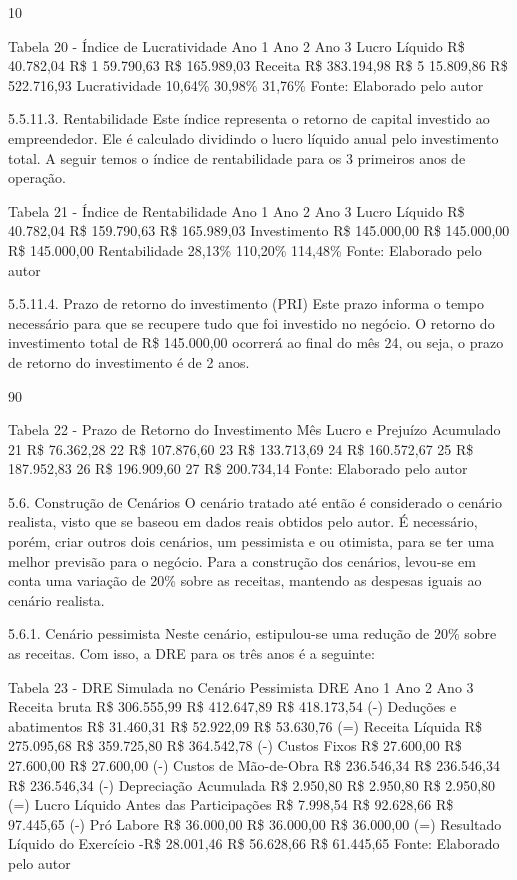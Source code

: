 10%

Tabela 20 - Índice de Lucratividade 
Ano 1	Ano 2	Ano 3
Lucro Líquido	R\$     40.782,04	R\$  1 59.790,63	R\$   165.989,03
Receita	R\$   383.194,98	R\$  5 15.809,86	R\$   522.716,93
Lucratividade	10,64\%	30,98\%	31,76\%
Fonte: Elaborado pelo autor 

5.5.11.3. 	Rentabilidade 
Este índice representa o retorno de capital investido ao empreendedor. Ele é calculado dividindo o lucro líquido anual pelo investimento total. A seguir temos o índice de rentabilidade para os 3 primeiros anos de operação.  

Tabela 21 - Índice de Rentabilidade 
Ano 1	Ano 2	Ano 3
Lucro Líquido	R\$     40.782,04	R\$   159.790,63	R\$   165.989,03
Investimento	R\$   145.000,00	R\$   145.000,00	R\$   145.000,00
Rentabilidade	28,13\%	110,20\%	114,48\%
Fonte: Elaborado pelo autor 

5.5.11.4. 	Prazo de retorno do investimento (PRI) 
Este prazo informa o tempo necessário para que se recupere tudo que foi investido no negócio. O retorno do investimento total de R\$ 145.000,00 ocorrerá ao final do mês 24, ou seja, o prazo de retorno do investimento é de 2 anos. 

90 

Tabela 22 - Prazo de Retorno do Investimento 
Mês	Lucro e Prejuízo Acumulado
21	R\$        76.362,28
22	R\$     107.876,60
23	R\$     133.713,69
24	R\$     160.572,67
25	R\$     187.952,83
26	R\$     196.909,60
27	R\$     200.734,14
Fonte: Elaborado pelo autor 

5.6. 	Construção de Cenários 
O cenário tratado até então é considerado o cenário realista, visto que se baseou em dados reais obtidos pelo autor. É necessário, porém, criar outros dois cenários, um pessimista e ou otimista, para se ter uma melhor previsão para o negócio.  
Para a construção dos cenários, levou-se em conta uma variação de 20\% sobre as receitas, mantendo as despesas iguais ao cenário realista. 

5.6.1. Cenário pessimista 
Neste cenário, estipulou-se uma redução de 20\% sobre as receitas. Com isso, a DRE para os três anos é a seguinte: 

Tabela 23 - DRE Simulada no Cenário Pessimista 
DRE	Ano 1	Ano 2	Ano 3
Receita bruta	R\$   306.555,99	R\$   412.647,89	R\$   418.173,54
(-) Deduções e abatimentos	R\$     31.460,31	R\$     52.922,09	R\$     53.630,76
(=) Receita Líquida	R\$   275.095,68	R\$   359.725,80	R\$   364.542,78
(-) Custos Fixos	R\$     27.600,00	R\$     27.600,00	R\$     27.600,00
(-) Custos de Mão-de-Obra	R\$   236.546,34	R\$   236.546,34	R\$   236.546,34
(-) Depreciação Acumulada	R\$       2.950,80	R\$       2.950,80	R\$       2.950,80
(=) Lucro Líquido Antes das 
Participações	R\$       7.998,54	R\$     92.628,66	R\$     97.445,65
(-) Pró Labore	R\$     36.000,00	R\$     36.000,00	R\$     36.000,00
(=) Resultado Líquido do 
Exercício	-R\$     28.001,46	R\$     56.628,66	R\$     61.445,65
Fonte: Elaborado pelo autor 

